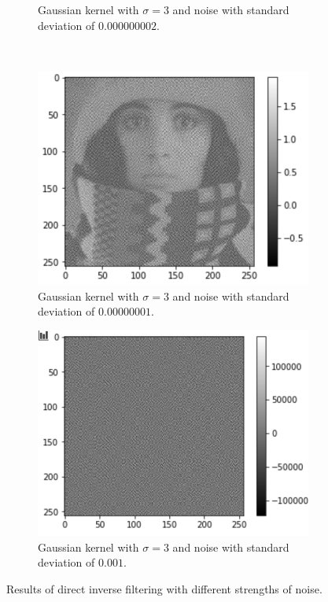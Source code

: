 \begin{figure}[H]
\begin{subfigure}[b]{0.45\linewidth}
		\caption{Gaussian kernel with $\sigma = 3$ and noise with standard deviation of $0.000000002$.}
	\end{subfigure}
	\\
	\begin{subfigure}[b]{0.45\linewidth}
		\centering
		\includegraphics[width=\linewidth]{Materials/E5/dbn00000001}
		\caption{Gaussian kernel with $\sigma = 3$ and noise with standard deviation of $0.00000001$.}
	\end{subfigure}
	\hfill
	\begin{subfigure}[b]{0.45\linewidth}
		\centering
		\includegraphics[width=\linewidth]{Materials/E5/dbn001}
		\caption{Gaussian kernel with $\sigma = 3$ and noise with standard deviation of $0.001$.}
	\end{subfigure}
	\caption{Results of direct inverse filtering with different strengths of noise.}
	\label{DirectInverse}
\end{figure}
